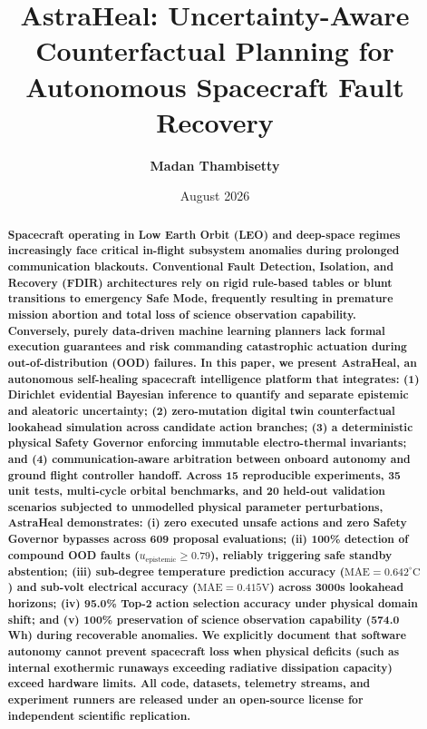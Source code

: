 \documentclass[10pt,twocolumn]{article}
\title{\textbf{\Large AstraHeal: Uncertainty-Aware Counterfactual Planning for Autonomous Spacecraft Fault Recovery}}
\author{\textbf{Madan Thambisetty}}
\affil{Autonomous Systems \& Aerospace Software Research Platform \\
\url{https://github.com/madankalyan2211/AstraHeal}}
\date{August 2026}
\begin{document}
\maketitle

\begin{abstract}
\textbf{Spacecraft operating in Low Earth Orbit (LEO) and deep-space regimes increasingly face critical in-flight subsystem anomalies during prolonged communication blackouts. Conventional Fault Detection, Isolation, and Recovery (FDIR) architectures rely on rigid rule-based tables or blunt transitions to emergency Safe Mode, frequently resulting in premature mission abortion and total loss of science observation capability. Conversely, purely data-driven machine learning planners lack formal execution guarantees and risk commanding catastrophic actuation during out-of-distribution (OOD) failures. In this paper, we present AstraHeal, an autonomous self-healing spacecraft intelligence platform that integrates: (1) Dirichlet evidential Bayesian inference to quantify and separate epistemic and aleatoric uncertainty; (2) zero-mutation digital twin counterfactual lookahead simulation across candidate action branches; (3) a deterministic physical Safety Governor enforcing immutable electro-thermal invariants; and (4) communication-aware arbitration between onboard autonomy and ground flight controller handoff. Across 15 reproducible experiments, 35 unit tests, multi-cycle orbital benchmarks, and 20 held-out validation scenarios subjected to unmodelled physical parameter perturbations, AstraHeal demonstrates: (i) zero executed unsafe actions and zero Safety Governor bypasses across 609 proposal evaluations; (ii) 100\% detection of compound OOD faults ($u_{\text{epistemic}} \ge 0.79$), reliably triggering safe standby abstention; (iii) sub-degree temperature prediction accuracy ($\text{MAE} = 0.642^\circ\text{C}$) and sub-volt electrical accuracy ($\text{MAE} = 0.415\text{V}$) across 3000s lookahead horizons; (iv) 95.0\% Top-2 action selection accuracy under physical domain shift; and (v) 100\% preservation of science observation capability (574.0 Wh) during recoverable anomalies. We explicitly document that software autonomy cannot prevent spacecraft loss when physical deficits (such as internal exothermic runaways exceeding radiative dissipation capacity) exceed hardware limits. All code, datasets, telemetry streams, and experiment runners are released under an open-source license for independent scientific replication.}
\end{abstract}
\end{document}
